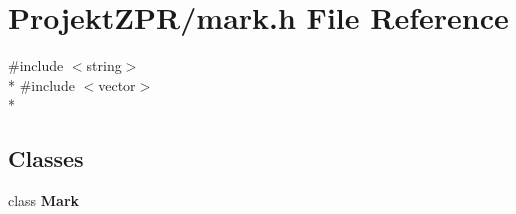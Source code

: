 \section{Projekt\-Z\-P\-R/mark.h File Reference}
\label{mark_8h}
{\ttfamily \#include $<$string$>$}\\*
{\ttfamily \#include $<$vector$>$}\\*
\subsection*{Classes}
\begin{DoxyCompactItemize}
\item 
class {\bf Mark}
\end{DoxyCompactItemize}
